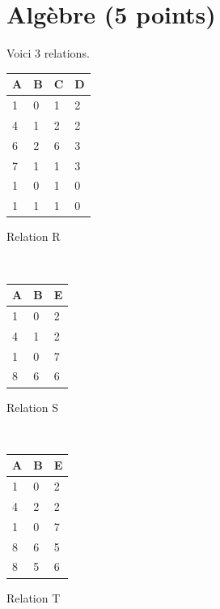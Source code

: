 \section{Algèbre (5 points)}

Voici 3 relations.

\medskip

\begin{minipage}[b]{5cm}
\begin{tabular}{llll}
A  & B   & C   & D\\ \hline
1  &  0  &  1   & 2\\
4   & 1  &  2   & 2\\
6    &2  &  6   & 3\\
7   & 1   & 1   & 3\\
1   & 0  &  1   & 0\\
1   & 1 &   1     &0\\ \hline
\end{tabular}

Relation R
\end{minipage}\
\begin{minipage}[b]{5cm}
\begin{tabular}{lll}
 A  &B  & E\\ \hline
1  & 0  & 2\\
4  & 1  & 2\\
1 &  0 &  7\\
8  & 6  & 6\\ \hline
\end{tabular}

Relation S
\end{minipage}
\
\begin{minipage}[b]{5cm}
\begin{tabular}{lll}
 A  &B  & E\\ \hline
1  & 0  & 2\\
4  & 2  & 2\\
1 &  0 &  7\\
8  & 6  & 5\\
8  & 5  & 6\\ \hline
\end{tabular}

Relation T
\end{minipage}


\medskip

